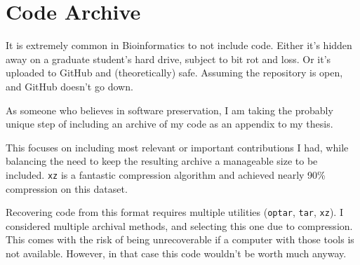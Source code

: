 \chapter{Code Archive}
\label{AppendixF}
It is extremely common in Bioinformatics to not include code. Either it's
hidden away on a graduate student's hard drive, subject to bit rot and loss. Or
it's uploaded to GitHub and (theoretically) safe. Assuming the repository is
open, and GitHub doesn't go down.

As someone who believes in software preservation, I am taking the probably
unique step of including an archive of my code as an appendix to my thesis.

This focuses on including most relevant or important contributions I had, while
balancing the need to keep the resulting archive a manageable size to be
included. \texttt{xz} is a fantastic compression algorithm and achieved nearly
90\% compression on this dataset.

Recovering code from this format requires multiple utilities (\texttt{optar},
\texttt{tar}, \texttt{xz}). I considered multiple archival methods, and
selecting this one due to compression. This comes with the risk of being
unrecoverable if a computer with those tools is not available. However, in that
case this code wouldn't be worth much anyway.
\clearpage

